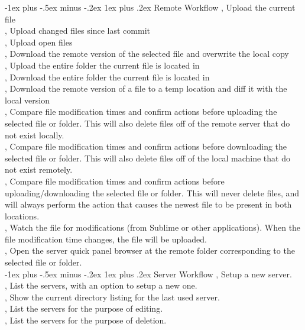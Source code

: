 \documentclass[10pt,landscape]{article}
\makeatletter
\renewcommand{\subsubsection}{\@startsection{subsubsection}{3}{0mm}%
                                {-1ex plus -.5ex minus -.2ex}%
                                {1ex plus .2ex}%
                                {\normalfont\small\bfseries}}
\makeatother
\begin{document}
\begin{multicols}{3}
\subsubsection{Remote Workflow}
,  Upload the current file \\
,  Upload changed files since last commit \\
,  Upload open files \\
,  Download the remote version of the selected file and overwrite the local copy \\
,  Upload the entire folder the current file is located in \\
,  Download the entire folder the current file is located in \\
,  Download the remote version of a file to a temp location and diff it with the local version \\
,  Compare file modification times and confirm actions before uploading the selected file or folder. This will also delete files off of the remote server that do not exist locally. \\
,  Compare file modification times and confirm actions before downloading the selected file or folder. This will also delete files off of the local machine that do not exist remotely. \\
,  Compare file modification times and confirm actions before uploading/downloading the selected file or folder. This will never delete files, and will always perform the action that causes the newest file to be present in both locations. \\
,  Watch the file for modifications (from Sublime or other applications). When the file modification time changes, the file will be uploaded. \\
,  Open the server quick panel browser at the remote folder corresponding to the selected file or folder. \\

\subsubsection{Server Workflow}
,  Setup a new server. \\
,  List the servers, with an option to setup a new one. \\
,  Show the current directory listing for the last used server. \\
,  List the servers for the purpose of editing. \\
,  List the servers for the purpose of deletion. \\


\end{multicols}
\end{document}
